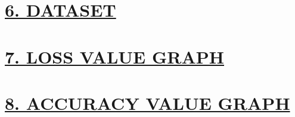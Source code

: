 \documentclass[a4paper,12pt]{article}
\begin{document}
            \section*{\fontsize{12}{14}\selectfont \hyperref[dataset]{6. DATASET}\protect{}}

         \section*{\fontsize{12}{14}\selectfont \hyperref[loss]{7. LOSS VALUE GRAPH}\protect{}}

        \section*{\fontsize{12}{14}\selectfont \hyperref[acc]{8. ACCURACY VALUE GRAPH}\protect{}}
\end{document}
